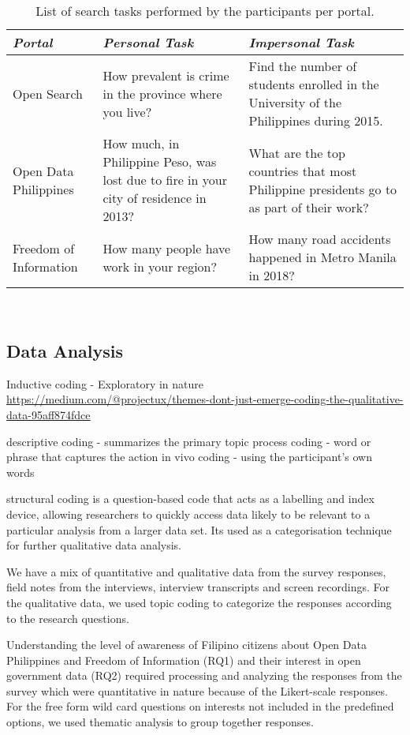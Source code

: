 \documentclass{sigchi}
\begin{document}
\begin{table*}
  \centering
  \begin{tabular}{l p{5.2cm} p{5.2cm}}
    {\small\textit{Portal}}
    & {\small \textit{Personal Task}}
      & {\small \textit{Impersonal Task}}\\
    \midrule
    Open Search & How prevalent is crime in the province where you live? & Find the number of students enrolled in the University of the Philippines during 2015.\\
    Open Data Philippines & How much, in Philippine Peso,  was lost due to fire in your city of residence in 2013? & What are the top countries that most Philippine presidents go to as part of their work? \\
    Freedom of Information & How many people have work in your region? & How many road accidents happened in Metro Manila in 2018?
  \end{tabular}
  \caption{List of search tasks performed by the participants per portal.}~\label{tab:searchtasks}
\end{table*}

\subsection{Data Analysis}
Inductive coding - Exploratory in nature
\url{https://medium.com/@projectux/themes-dont-just-emerge-coding-the-qualitative-data-95aff874fdce}

descriptive coding - summarizes the primary topic
process coding - word or phrase that captures the action
in vivo coding - using the participant's own words

structural coding is a question-based code that acts as a labelling and index device, allowing researchers to quickly access data likely to be relevant to a particular analysis from a larger data set. Its used as a categorisation technique for further qualitative data analysis.

We have a mix of quantitative and qualitative data from the survey responses, field notes from the interviews, interview transcripts and screen recordings. For the qualitative data, we used topic coding to categorize the responses according to the research questions.

Understanding the level of awareness of Filipino citizens about Open Data Philippines and Freedom of Information (RQ1) and their interest in open government data (RQ2) required processing and analyzing the responses from the survey which were quantitative in nature because of the Likert-scale responses. For the free form wild card questions on interests not included in the predefined options, we used thematic analysis to group together responses.
\end{document}
